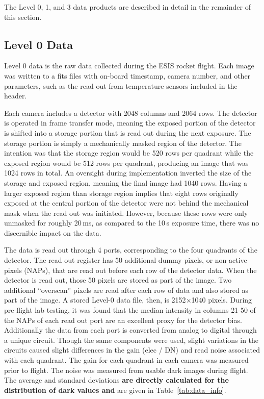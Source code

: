 The Level 0, 1, and 3 data products are described in detail in the remainder of this section. 


    
\subsection{Level 0 Data}
    
Level 0 data is the raw data collected during the ESIS rocket flight.  
Each image was written to a fits files with on-board timestamp, camera number, and other parameters, such as the read out from temperature sensors included in the header.   

Each camera includes a detector with 2048 columns and 2064 rows.  The detector is operated in frame transfer mode, meaning the exposed portion of the detector is shifted into a storage portion that is read out during the next exposure. The storage portion is simply a mechanically masked region of the detector. The intention was that the storage region would be 520 rows per quadrant while the exposed region would be 512 rows per quadrant, producing an image that was 1024 rows in total.  An oversight during implementation inverted the size of the storage and exposed region, meaning the final image had 1040 rows.  Having a larger exposed region than storage region implies that eight rows originally exposed at the central portion of the detector were not behind the mechanical mask when the read out was initiated. However, because these rows were only unmasked for roughly 20\,ms, as compared to the 10\,s exposure time, there was no discernible impact on the data. 



The data is read out through 4 ports, corresponding to the four quadrants of the detector.  The read out register has 50 additional dummy pixels, or non-active pixels (NAPs), that are read out before each row of the detector data.  When the detector is read out, those 50 pixels are stored as part of the image.  Two additional ``overscan'' pixels are read after each row of data and also stored as part of the image.  A stored Level-0 data file, then, is 2152$\times$1040 pixels.   During pre-flight lab testing, it was found that the median intensity in columns 21-50 of the NAPs of each read out port are an excellent proxy for the detector bias.  Additionally the data from each port is converted from analog to digital through a unique circuit.  Though the same components were used, slight variations in the circuits caused slight differences in the gain (elec / DN) and read  noise associated with each quadrant.  The gain for each quadrant in each camera was measured prior to flight.  The noise was measured from usable dark images during flight.  The average and standard deviations \textbf{are directly calculated for the distribution of dark values and} are given in Table~\ref{tab:data_info}.
    
